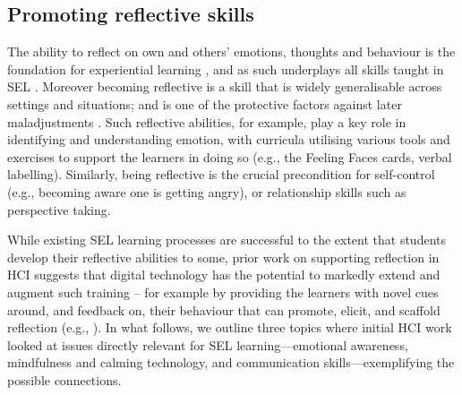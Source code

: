 \documentclass[prodmode,acmtochi]{acmsmall}
\begin{document}




                 

\subsection{Promoting reflective skills}
\label{sec:feedback}
The ability to reflect on own and others' emotions, thoughts and behaviour is the foundation for experiential learning \cite{Moon1999}, and as such underplays all skills taught in SEL \cite{Cohen2001,Cohen2006,Pasi2001,Zins2004,Maree2007,CASEL2013}. %
Moreover becoming reflective is a skill that is widely generalisable across settings and situations; and is one of the protective factors against later maladjustments \cite{Zins2004}. Such reflective abilities, for example, play a key role in identifying and understanding emotion, with curricula utilising various tools and exercises to support the learners in doing so (e.g., the Feeling Faces cards, verbal labelling). Similarly, being reflective is the crucial precondition for self-control (e.g., becoming aware one is getting angry), or relationship skills such as perspective taking. 

While existing SEL learning processes are successful to the extent that students develop their reflective abilities to some, prior work on supporting reflection in HCI suggests that digital technology has the potential to markedly extend and augment such training -- for example by providing the learners with novel cues around, and feedback on, their behaviour that can promote, elicit, and scaffold reflection (e.g., \cite{Fleck2010,Stahl2008,Thieme2011,Isaacs2013}). In what follows, we outline three topics where initial HCI work looked at issues directly relevant for SEL learning---emotional awareness, mindfulness and calming technology, and communication skills---exemplifying the possible connections.

\end{document}
